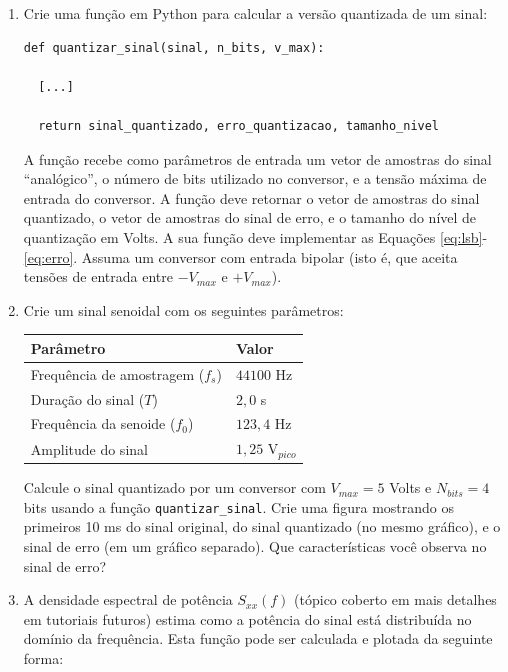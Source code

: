 \documentclass[a4paper,twoside,12pt]{article}
\begin{document}
	\begin{enumerate}
		\item Crie uma função em Python para calcular a versão quantizada de um sinal:
		\
\begin{lstlisting}[frame=single]
def quantizar_sinal(sinal, n_bits, v_max):

  [...]
	
  return sinal_quantizado, erro_quantizacao, tamanho_nivel
\end{lstlisting} 
		A função recebe como parâmetros de entrada um vetor de amostras do sinal ``analógico'', o número de bits utilizado no conversor, e a tensão máxima de entrada do conversor. A função deve retornar o vetor de amostras do sinal quantizado, o vetor de amostras do sinal de erro, e o tamanho do nível de quantização em Volts. A sua função deve implementar as Equações \ref{eq:lsb}-\ref{eq:erro}. Assuma um conversor com entrada bipolar (isto é, que aceita tensões de entrada entre $-V_{max}$ e $+V_{max}$). 
		
		\item Crie um sinal senoidal com os seguintes parâmetros:
		\begin{center}
			\begin{tabular}{ll}
				\textbf{Parâmetro} & \textbf{Valor} \\
				\hline
				Frequência de amostragem ($f_s$) & $44100$ Hz \\
				Duração do sinal ($T$)           & $2,0$ s \\
				Frequência da senoide ($f_0$)    & $123,4$ Hz \\
				Amplitude do sinal               & $1,25$ V$_{pico}$ \\
			\end{tabular}
		\end{center}
		
		Calcule o sinal quantizado por um conversor com $V_{max}=5$ Volts e $N_{bits}=4$ bits usando a função {\tt quantizar\_sinal}. Crie uma figura mostrando os primeiros 10 ms do sinal original, do sinal quantizado (no mesmo gráfico), e o sinal de erro (em um gráfico separado). Que características você observa no sinal de erro?
		
		\item A densidade espectral de potência $S_{xx}(f)$ (tópico coberto em mais detalhes em tutoriais futuros) estima como a potência do sinal está distribuída no domínio da frequência. Esta função pode ser calculada e plotada da seguinte forma:
		

\end{enumerate}
\end{document}

